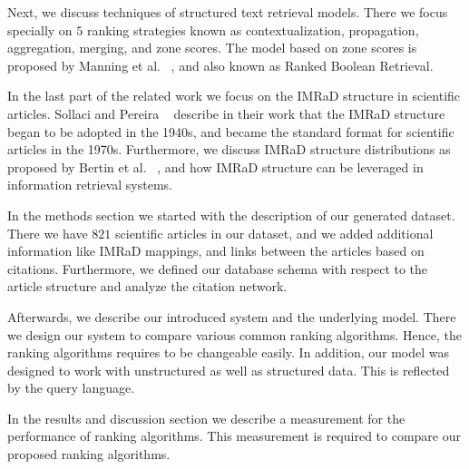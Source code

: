 Next, we discuss techniques of structured text retrieval models. There we focus specially on $5$ ranking strategies known as contextualization, propagation, aggregation, merging, and zone scores. The model based on zone scores is proposed by Manning et al. ~\cite{manning2008}, and also known as Ranked Boolean Retrieval.

In the last part of the related work we focus on the IMRaD structure in scientific articles. Sollaci and Pereira ~\cite{Sollaci-The-2004} describe in their work that the IMRaD structure began to be adopted in the 1940s, and became the standard format for scientific articles in the 1970s. Furthermore, we discuss IMRaD structure distributions as proposed by Bertin et al. ~\cite{bertin2013}, and how IMRaD structure can be leveraged in information retrieval systems.

In the methods section we started with the description of our generated dataset. There we have $821$ scientific articles in our dataset, and we added additional information like IMRaD mappings, and links between the articles based on citations. Furthermore, we defined our database schema with respect to the article structure and analyze the citation network.

Afterwards, we describe our introduced system and the underlying model. There we design our system to compare various common ranking algorithms. Hence, the ranking algorithms requires to be changeable easily. In addition, our model was designed to work with unstructured as well as structured data. This is reflected by the query language.

In the results and discussion section we describe a measurement for the performance of ranking algorithms. This measurement is required to compare our proposed ranking algorithms.

